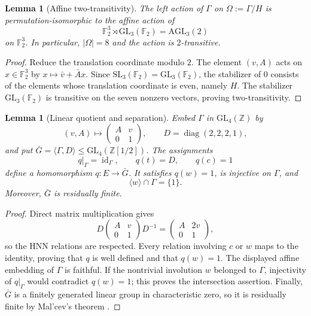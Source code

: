 \documentclass[11pt]{article}
\newtheorem{lemma}[theorem]{Lemma}
\theoremstyle{definition}
\theoremstyle{remark}
\newcommand{\Z}{\mathbb Z}
\newcommand{\F}{\mathbb F}
\begin{document}
\begin{lemma}[Affine two-transitivity]\label{lem:2trans}
The left action of $\Gamma$ on $\Omega:=\Gamma/H$ is permutation-isomorphic
to the affine action of
\[
 \F_2^3\rtimes \mathrm{GL}_3(\F_2)=\mathrm{AGL}_3(2)
\]
on $\F_2^3$.  In particular, $|\Omega|=8$ and the action is
$2$-transitive.
\end{lemma}

\begin{proof}
Reduce the translation coordinate modulo $2$.  The element $(v,A)$ acts on
$x\in\F_2^3$ by $x\mapsto \bar v+\bar A x$.  Since
$\mathrm{SL}_3(\F_2)=\mathrm{GL}_3(\F_2)$, the stabilizer of $0$ consists
of the elements whose translation coordinate is even, namely $H$.
The stabilizer $\mathrm{GL}_3(\F_2)$ is transitive on the seven nonzero
vectors, proving two-transitivity.
\end{proof}

\begin{lemma}[Linear quotient and separation]\label{lem:linearquotient}
Embed $\Gamma$ in $\mathrm{GL}_4(\Z)$ by
\[
 (v,A)\longmapsto
 \begin{pmatrix}A&v\\0&1\end{pmatrix},
 \qquad
 D=\operatorname{diag}(2,2,2,1),
\]
and put $\bar G=\langle\Gamma,D\rangle\le\mathrm{GL}_4(\Z[1/2])$.  The assignments
\[
 q|_\Gamma=\operatorname{id}_\Gamma,\qquad q(t)=D,\qquad q(c)=1
\]
define a homomorphism $q:E\to\bar G$.  It satisfies $q(w)=1$, is injective
on $\Gamma$, and
\[
 \langle w\rangle\cap\Gamma=\{1\}.
\]
Moreover, $\bar G$ is residually finite.
\end{lemma}

\begin{proof}
Direct matrix multiplication gives
\[
 D\begin{pmatrix}A&v\\0&1\end{pmatrix}D^{-1}
 =\begin{pmatrix}A&2v\\0&1\end{pmatrix},
\]
so the HNN relations are respected.  Every relation involving $c$ or $w$
maps to the identity, proving that $q$ is well defined and that $q(w)=1$.
The displayed affine embedding of $\Gamma$ is faithful.  If the nontrivial
involution $w$ belonged to $\Gamma$, injectivity of $q|_\Gamma$ would
contradict $q(w)=1$; this proves the intersection assertion.  Finally,
$\bar G$ is a finitely generated linear group in characteristic zero, so it
is residually finite by Mal'cev's theorem \cite{Malcev}.
\end{proof}
\end{document}
